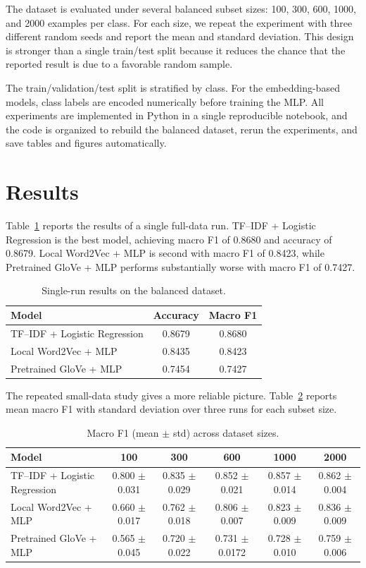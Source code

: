 \documentclass[10pt]{article}
\begin{document}
The dataset is evaluated under several balanced subset sizes: 100, 300, 600, 1000, and 2000 examples per class. For each size, we repeat the experiment with three different random seeds and report the mean and standard deviation. This design is stronger than a single train/test split because it reduces the chance that the reported result is due to a favorable random sample.

The train/validation/test split is stratified by class. For the embedding-based models, class labels are encoded numerically before training the MLP. All experiments are implemented in Python in a single reproducible notebook, and the code is organized to rebuild the balanced dataset, rerun the experiments, and save tables and figures automatically.

\section{Results}
Table~\ref{tab:single} reports the results of a single full-data run. TF--IDF + Logistic Regression is the best model, achieving macro F1 of 0.8680 and accuracy of 0.8679. Local Word2Vec + MLP is second with macro F1 of 0.8423, while Pretrained GloVe + MLP performs substantially worse with macro F1 of 0.7427.

\begin{table}[H]
\centering
\caption{Single-run results on the balanced dataset.}
\label{tab:single}
\begin{tabular}{lcc}
\toprule
Model & Accuracy & Macro F1 \\
\midrule
TF--IDF + Logistic Regression & 0.8679 & 0.8680 \\
Local Word2Vec + MLP & 0.8435 & 0.8423 \\
Pretrained GloVe + MLP & 0.7454 & 0.7427 \\
\bottomrule
\end{tabular}
\end{table}

The repeated small-data study gives a more reliable picture. Table~\ref{tab:study} reports mean macro F1 with standard deviation over three runs for each subset size.

\begin{table}[H]
\centering
\caption{Macro F1 (mean $\pm$ std) across dataset sizes.}
\label{tab:study}
\begin{tabular}{lccccc}
\toprule
Model & 100 & 300 & 600 & 1000 & 2000 \\
\midrule
TF--IDF + Logistic Regression & 0.800 $\pm$ 0.031 & 0.835 $\pm$ 0.029 & 0.852 $\pm$ 0.021 & 0.857 $\pm$ 0.014 & 0.862 $\pm$ 0.004 \\
Local Word2Vec + MLP & 0.660 $\pm$ 0.017 & 0.762 $\pm$ 0.018 & 0.806 $\pm$ 0.007 & 0.823 $\pm$ 0.009 & 0.836 $\pm$ 0.009 \\
Pretrained GloVe + MLP & 0.565 $\pm$ 0.045 & 0.720 $\pm$ 0.022 & 0.731 $\pm$ 0.0172 & 0.728 $\pm$ 0.010 & 0.759 $\pm$ 0.006 \\
\bottomrule
\end{tabular}
\end{table}
\end{document}
